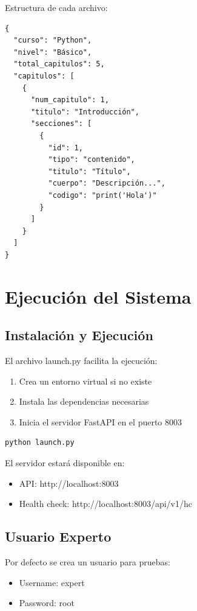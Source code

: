 \documentclass[12pt,a4paper]{article}
\begin{document}
Estructura de cada archivo:
\begin{verbatim}
{
  "curso": "Python",
  "nivel": "Básico",
  "total_capitulos": 5,
  "capitulos": [
    {
      "num_capitulo": 1,
      "titulo": "Introducción",
      "secciones": [
        {
          "id": 1,
          "tipo": "contenido",
          "titulo": "Título",
          "cuerpo": "Descripción...",
          "codigo": "print('Hola')"
        }
      ]
    }
  ]
}
\end{verbatim}

\section{Ejecución del Sistema}

\subsection{Instalación y Ejecución}
El archivo launch.py facilita la ejecución:

\begin{enumerate}
    \item Crea un entorno virtual si no existe
    \item Instala las dependencias necesarias
    \item Inicia el servidor FastAPI en el puerto 8003
\end{enumerate}

\begin{lstlisting}[language=bash]
python launch.py
\end{lstlisting}

El servidor estará disponible en:
\begin{itemize}
    \item API: http://localhost:8003
    \item Health check: http://localhost:8003/api/v1/hc
\end{itemize}

\subsection{Usuario Experto}
Por defecto se crea un usuario para pruebas:
\begin{itemize}
    \item Username: expert
    \item Password: root
\end{itemize}
\end{document}
